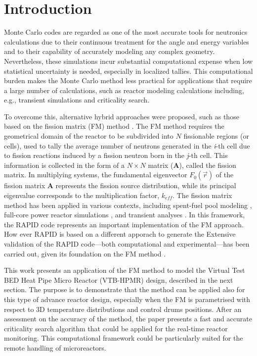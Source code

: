 \documentclass[preprint,review,12pt]{elsarticle}
\begin{document}
\section{Introduction} \label{section:Introduction}

Monte Carlo codes are regarded as one of the most accurate tools for neutronics calculations due to their continuous treatment for the angle and energy variables and to their capability of accurately modeling any complex geometry. Nevertheless, these simulations incur substantial computational expense when low statistical uncertainty is needed, especially in localized tallies. This computational burden makes the Monte Carlo method less practical for applications that require a large number of calculations, such as reactor modeling calculations including, e.g., transient simulations and criticality search.

To overcome this, alternative hybrid approaches were proposed, such as those based on the fission matrix (FM) method \cite{Carney2014}. The FM method requires the geometrical domain of the reactor to be subdivided into $N$ fissionable regions (or cells), used to tally the average number of neutrons generated in the \textit{i}-th cell due to fission reactions induced by a fission neutron born in the \textit{j}-th cell. This information is collected in the form of a $N \times N$ matrix ($\textbf{A}$), called the fission matrix. In multiplying systems, the fundamental eigenvector $F_0(\vec{r})$ of the fission matrix $\textbf{A}$ represents the fission source distribution, while its principal eigenvalue corresponds to the multiplication factor, $k_{eff}$.
The fission matrix method has been applied in various contexts, including spent-fuel pool modeling \cite{Walter00}, full-core power reactor simulations \cite{Walters2018}, and transient analyses \cite{Laureau2015}.
In this framework, the RAPID code represents an important implementation of the FM approach. How ever RAPID is based on a different apporach to generate the Extensive validation of the RAPID code—both computational and experimental—has been carried out, given its foundation on the FM method \cite{RAU2020103273,Mascolino2022_triga,Mascolino_trapid}.

This work presents an application of the FM method to model the Virtual Test BED Heat Pipe Micro Reactor (VTB-HPMR) design, described in the next section. The purpose is to demonstrate that the method can be applied also for this type of advance reactor design, especially when the FM is parametrised with respect to 3D temperature distributions and control drums positions. After an assessment on the accuracy of the method, the paper presents a fast and accurate criticality search algorithm that could be applied for the real-time reactor monitoring. This computational framework could be particularly suited for the remote handling of microreactors.
\end{document}
